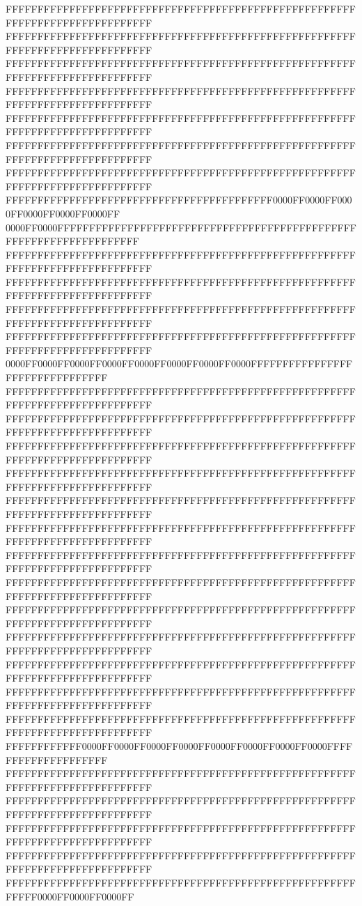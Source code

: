 FFFFFFFFFFFFFFFFFFFFFFFFFFFFFFFFFFFFFFFFFFFFFFFFFFFFFFFFFFFFFFFFFFFFFFFFFFFFFF
FFFFFFFFFFFFFFFFFFFFFFFFFFFFFFFFFFFFFFFFFFFFFFFFFFFFFFFFFFFFFFFFFFFFFFFFFFFFFF
FFFFFFFFFFFFFFFFFFFFFFFFFFFFFFFFFFFFFFFFFFFFFFFFFFFFFFFFFFFFFFFFFFFFFFFFFFFFFF
FFFFFFFFFFFFFFFFFFFFFFFFFFFFFFFFFFFFFFFFFFFFFFFFFFFFFFFFFFFFFFFFFFFFFFFFFFFFFF
FFFFFFFFFFFFFFFFFFFFFFFFFFFFFFFFFFFFFFFFFFFFFFFFFFFFFFFFFFFFFFFFFFFFFFFFFFFFFF
FFFFFFFFFFFFFFFFFFFFFFFFFFFFFFFFFFFFFFFFFFFFFFFFFFFFFFFFFFFFFFFFFFFFFFFFFFFFFF
FFFFFFFFFFFFFFFFFFFFFFFFFFFFFFFFFFFFFFFFFFFFFFFFFFFFFFFFFFFFFFFFFFFFFFFFFFFFFF
FFFFFFFFFFFFFFFFFFFFFFFFFFFFFFFFFFFFFFFFFF0000FF0000FF0000FF0000FF0000FF0000FF
0000FF0000FFFFFFFFFFFFFFFFFFFFFFFFFFFFFFFFFFFFFFFFFFFFFFFFFFFFFFFFFFFFFFFFFFFF
FFFFFFFFFFFFFFFFFFFFFFFFFFFFFFFFFFFFFFFFFFFFFFFFFFFFFFFFFFFFFFFFFFFFFFFFFFFFFF
FFFFFFFFFFFFFFFFFFFFFFFFFFFFFFFFFFFFFFFFFFFFFFFFFFFFFFFFFFFFFFFFFFFFFFFFFFFFFF
FFFFFFFFFFFFFFFFFFFFFFFFFFFFFFFFFFFFFFFFFFFFFFFFFFFFFFFFFFFFFFFFFFFFFFFFFFFFFF
FFFFFFFFFFFFFFFFFFFFFFFFFFFFFFFFFFFFFFFFFFFFFFFFFFFFFFFFFFFFFFFFFFFFFFFFFFFFFF
0000FF0000FF0000FF0000FF0000FF0000FF0000FF0000FFFFFFFFFFFFFFFFFFFFFFFFFFFFFFFF
FFFFFFFFFFFFFFFFFFFFFFFFFFFFFFFFFFFFFFFFFFFFFFFFFFFFFFFFFFFFFFFFFFFFFFFFFFFFFF
FFFFFFFFFFFFFFFFFFFFFFFFFFFFFFFFFFFFFFFFFFFFFFFFFFFFFFFFFFFFFFFFFFFFFFFFFFFFFF
FFFFFFFFFFFFFFFFFFFFFFFFFFFFFFFFFFFFFFFFFFFFFFFFFFFFFFFFFFFFFFFFFFFFFFFFFFFFFF
FFFFFFFFFFFFFFFFFFFFFFFFFFFFFFFFFFFFFFFFFFFFFFFFFFFFFFFFFFFFFFFFFFFFFFFFFFFFFF
FFFFFFFFFFFFFFFFFFFFFFFFFFFFFFFFFFFFFFFFFFFFFFFFFFFFFFFFFFFFFFFFFFFFFFFFFFFFFF
FFFFFFFFFFFFFFFFFFFFFFFFFFFFFFFFFFFFFFFFFFFFFFFFFFFFFFFFFFFFFFFFFFFFFFFFFFFFFF
FFFFFFFFFFFFFFFFFFFFFFFFFFFFFFFFFFFFFFFFFFFFFFFFFFFFFFFFFFFFFFFFFFFFFFFFFFFFFF
FFFFFFFFFFFFFFFFFFFFFFFFFFFFFFFFFFFFFFFFFFFFFFFFFFFFFFFFFFFFFFFFFFFFFFFFFFFFFF
FFFFFFFFFFFFFFFFFFFFFFFFFFFFFFFFFFFFFFFFFFFFFFFFFFFFFFFFFFFFFFFFFFFFFFFFFFFFFF
FFFFFFFFFFFFFFFFFFFFFFFFFFFFFFFFFFFFFFFFFFFFFFFFFFFFFFFFFFFFFFFFFFFFFFFFFFFFFF
FFFFFFFFFFFFFFFFFFFFFFFFFFFFFFFFFFFFFFFFFFFFFFFFFFFFFFFFFFFFFFFFFFFFFFFFFFFFFF
FFFFFFFFFFFFFFFFFFFFFFFFFFFFFFFFFFFFFFFFFFFFFFFFFFFFFFFFFFFFFFFFFFFFFFFFFFFFFF
FFFFFFFFFFFFFFFFFFFFFFFFFFFFFFFFFFFFFFFFFFFFFFFFFFFFFFFFFFFFFFFFFFFFFFFFFFFFFF
FFFFFFFFFFFF0000FF0000FF0000FF0000FF0000FF0000FF0000FF0000FFFFFFFFFFFFFFFFFFFF
FFFFFFFFFFFFFFFFFFFFFFFFFFFFFFFFFFFFFFFFFFFFFFFFFFFFFFFFFFFFFFFFFFFFFFFFFFFFFF
FFFFFFFFFFFFFFFFFFFFFFFFFFFFFFFFFFFFFFFFFFFFFFFFFFFFFFFFFFFFFFFFFFFFFFFFFFFFFF
FFFFFFFFFFFFFFFFFFFFFFFFFFFFFFFFFFFFFFFFFFFFFFFFFFFFFFFFFFFFFFFFFFFFFFFFFFFFFF
FFFFFFFFFFFFFFFFFFFFFFFFFFFFFFFFFFFFFFFFFFFFFFFFFFFFFFFFFFFFFFFFFFFFFFFFFFFFFF
FFFFFFFFFFFFFFFFFFFFFFFFFFFFFFFFFFFFFFFFFFFFFFFFFFFFFFFFFFFF0000FF0000FF0000FF
